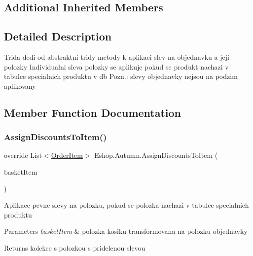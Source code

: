 \subsection*{Additional Inherited Members}


\subsection{Detailed Description}
Trida dedi od abstraktni tridy metody k aplikaci slev na objednavku a jeji polozky Individualni sleva polozky se aplikuje pokud se produkt nachazi v tabulce specialnich produktu v db Pozn.\+: slevy objednavky nejsou na podzim aplikovany 



\subsection{Member Function Documentation}
\mbox{\label{class_eshop_1_1_autumn_a8b81fea543d4da4da80b981e3d18e71f}} 
\subsubsection{\texorpdfstring{AssignDiscountsToItem()}{AssignDiscountsToItem()}}
{\footnotesize\ttfamily override List$<$\mbox{\hyperlink{class_eshop_1_1_order_item}{Order\+Item}}$>$ Eshop.\+Autumn.\+Assign\+Discounts\+To\+Item (\begin{DoxyParamCaption}\item[{Key\+Value\+Pair$<$ \mbox{\hyperlink{class_eshop_1_1_product}{Product}}, int $>$}]{basket\+Item }\end{DoxyParamCaption})\hspace{0.3cm}{\ttfamily [virtual]}}



Aplikace pevne slevy na polozku, pokud se polozka nachazi v tabulce specialnich produktu 


\begin{DoxyParams}{Parameters}
{\em basket\+Item} & polozka kosiku transformovana na polozku objednavky\\
\hline
\end{DoxyParams}
\begin{DoxyReturn}{Returns}
kolekce s polozkou s pridelenou slevou
\end{DoxyReturn}


